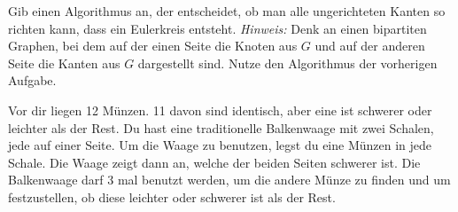 \documentclass{uebung_cs}
\begin{document}
\begin{aufgabe}
\begin{figure}[ht]
\begin{minipage}[b]{0.5\textwidth}
    	
    	\end{minipage}
    \end{figure}
    
    Gib einen Algorithmus an, der entscheidet, ob man alle ungerichteten Kanten so richten kann, dass ein Eulerkreis entsteht.
    \textit{Hinweis:} Denk an einen bipartiten Graphen, bei dem auf der einen Seite die Knoten aus $G$ und auf der anderen Seite die Kanten aus $G$ dargestellt sind. Nutze den Algorithmus der vorherigen Aufgabe.
\end{aufgabe}

\begin{aufgabe}
	Vor dir liegen 12 Münzen. 11 davon sind identisch, aber eine ist schwerer oder leichter als der Rest. Du hast eine traditionelle Balkenwaage mit zwei Schalen, jede auf einer Seite. Um die Waage zu benutzen, legst du eine Münzen in jede Schale. Die Waage zeigt dann an, welche der beiden Seiten schwerer ist. Die Balkenwaage darf 3 mal benutzt werden, um die andere Münze zu finden und um festzustellen, ob diese leichter oder schwerer ist als der Rest.
	
\end{aufgabe}
\end{document}
